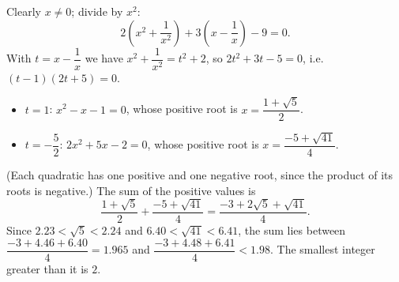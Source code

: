 Clearly $x\ne0$; divide by $x^2$:
\[
2\left(x^2+\dfrac{1}{x^2}\right)+3\left(x-\dfrac{1}{x}\right)-9=0 .
\]
With $t=x-\dfrac{1}{x}$ we have $x^2+\dfrac{1}{x^2}=t^2+2$, so $2t^2+3t-5=0$, i.e.\ $(t-1)(2t+5)=0$.
\begin{itemize}
\item $t=1$: $x^2-x-1=0$, whose positive root is $x=\dfrac{1+\sqrt5}{2}$.
\item $t=-\dfrac{5}{2}$: $2x^2+5x-2=0$, whose positive root is $x=\dfrac{-5+\sqrt{41}}{4}$.
\end{itemize}
(Each quadratic has one positive and one negative root, since the product of its roots is negative.) The sum of the positive values is
\[
\dfrac{1+\sqrt5}{2}+\dfrac{-5+\sqrt{41}}{4}=\dfrac{-3+2\sqrt5+\sqrt{41}}{4}.
\]
Since $2.23<\sqrt5<2.24$ and $6.40<\sqrt{41}<6.41$, the sum lies between $\dfrac{-3+4.46+6.40}{4}=1.965$ and $\dfrac{-3+4.48+6.41}{4}<1.98$. The smallest integer greater than it is $\boxed{2}$.
